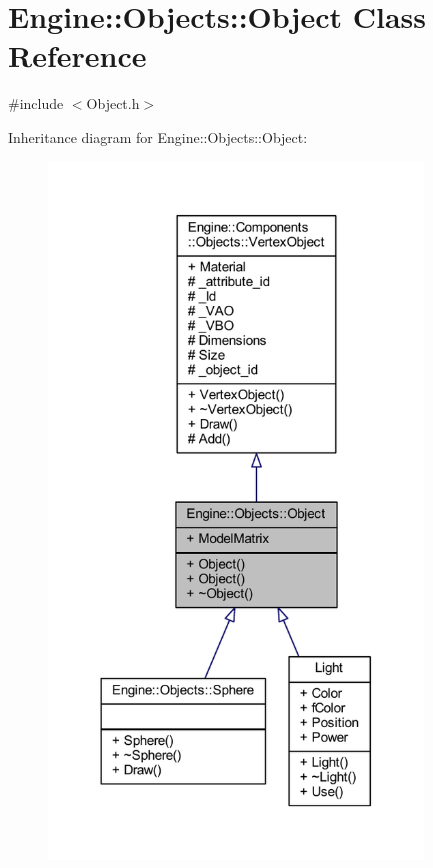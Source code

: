 \hypertarget{classEngine_1_1Objects_1_1Object}{}\section{Engine\+:\+:Objects\+:\+:Object Class Reference}
\label{classEngine_1_1Objects_1_1Object}


{\ttfamily \#include $<$Object.\+h$>$}



Inheritance diagram for Engine\+:\+:Objects\+:\+:Object\+:
\nopagebreak
\begin{figure}[H]
\begin{center}
\leavevmode
\includegraphics[width=282pt]{classEngine_1_1Objects_1_1Object__inherit__graph}
\end{center}
\end{figure}


